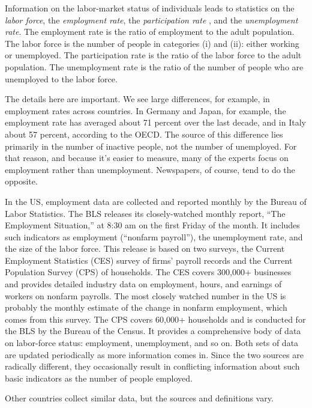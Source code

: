 Information on the labor-market status of individuals leads to
statistics on the {\it labor force\/}, 
the {\it employment rate\/},
the {\it participation rate \/}, 
and the {\it unemployment rate\/}. 
The employment rate is the ratio of employment to the adult population. 
The labor force is the number of people in categories (i) and
(ii): either working or unemployed.
The participation rate is the ratio of the labor force to the adult population. 
The unemployment rate is the ratio of the number of people who are unemployed to the labor force.

The details here are important.
We see large differences, for example, in employment rates across countries.
In Germany and Japan, for example,
the employment rate has averaged about 71 percent over the last decade,
and in Italy about 57 percent, according to the OECD.
The source of this difference lies primarily in the number of inactive
people, not the number of unemployed.
For that reason, and because it's easier to measure,
many of the experts focus on employment rather than unemployment.
Newspapers, of course, tend to do the opposite.


In the US, employment data are collected and reported monthly by
the Bureau of Labor Statistics. The BLS releases its
closely-watched monthly report, ``The Employment Situation,'' at
8:30 am on the first Friday of the month.  It includes such
indicators as employment (``nonfarm payroll''),
the unemployment rate, and the size of the labor force.
This release is based on two surveys, the Current
Employment Statistics (CES) survey of firms' payroll records and
the Current Population Survey (CPS) of households. The CES covers
300,000+ businesses and provides detailed industry data on
employment, hours, and earnings of workers on nonfarm payrolls.
The most closely watched number in the US is probably the monthly
estimate of the change in nonfarm employment, which comes from this survey.
The CPS covers 60,000+ households and is conducted for the BLS by
the Bureau of the Census. It provides a comprehensive body of data
on labor-force status:  employment, unemployment, and so on.  Both
sets of data are updated periodically as more information comes
in.  Since the two sources are radically different,
they occasionally result in conflicting information about such
basic indicators as the number of people employed.

Other countries collect similar data, but the sources and definitions vary.

